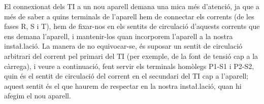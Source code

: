 El connexionat dels TI a un nou aparell demana una mica m\'{e}s
d'atenci\'{o}, ja que a m\'{e}s de saber a  quins terminals de l'aparell hem
de connectar els corrents (de les fases R, S i T), hem de fixar-nos
en els sentits de circulaci\'{o} d'aquests corrents que ens demana
l'aparell, i mantenir-los quan incorporem l'aparell a la nostra
insta{\l.l}aci\'{o}. La manera de no equivocar-se, \'{e}s suposar un sentit de
circulaci\'{o} arbitrari del corrent  pel primari del TI (per exemple,
de la font de tensi\'{o} cap a la c\`{a}rrega), i veure a continuaci\'{o}, fent
servir els terminals hom\`{o}legs P1-S1 i P2-S2, quin \'{e}s el sentit de
circulaci\'{o} del corrent en el secundari del TI cap a l'aparell;
aquest sentit \'{e}s el que haurem de respectar en la nostra
insta{\l.l}aci\'{o}, quan hi afegim el nou aparell.


